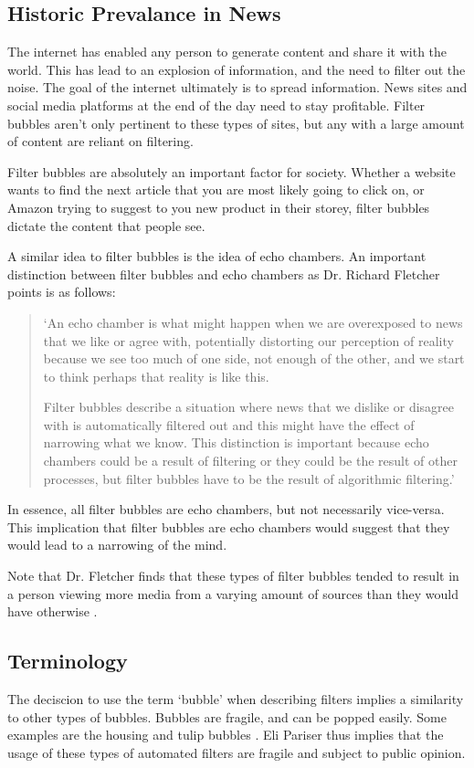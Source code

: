 \documentclass[12pt]{article}
\begin{document}
\subsection{Historic Prevalance in News}
The internet has enabled any person to generate content and share it with the
world. This has lead to an explosion of information, and the need to filter out
the noise. The goal of the internet ultimately is to spread information. News
sites and social media platforms at the end of the day need to stay profitable.
Filter bubbles aren't only pertinent to these types of sites, but any with
a large amount of content are reliant on filtering.

Filter bubbles are absolutely an important factor for society. Whether a website
wants to find the next article that you are most likely going to click on, or
Amazon trying to suggest to you new product in their storey, filter bubbles
dictate the content that people see.

A similar idea to filter bubbles is the idea of echo chambers. An important
distinction between filter bubbles and echo chambers as Dr. Richard Fletcher
points is as follows:

\begin{quote}
    `An echo chamber is what might happen when we are overexposed to news that we like or agree with, potentially distorting our perception of reality because we see too much of one side, not enough of the other, and we start to think perhaps that reality is like this.

    Filter bubbles describe a situation where news that we dislike or disagree with
    is automatically filtered out and this might have the effect of narrowing what
    we know. This distinction is important because echo chambers could be a result
    of filtering or they could be the result of other processes, but filter bubbles
    have to be the result of algorithmic filtering.' \cite{richard}
\end{quote}

In essence, all filter bubbles are echo chambers, but not necessarily vice-versa.
This implication that filter bubbles are echo chambers would suggest that they would
lead to a narrowing of the mind.

Note that Dr. Fletcher finds that these types of filter bubbles tended to result
in a person viewing more media from a varying amount of sources than they would
have otherwise \cite{richard}.

\subsection{Terminology}
The deciscion to use the term `bubble' when describing filters implies a
similarity to other types of bubbles. Bubbles are fragile, and can be popped
easily. Some examples are the housing \cite{publications2006us} and tulip
bubbles \cite{dash2011tulipomania}. Eli Pariser thus implies that the usage
of these types of automated filters are fragile and subject to public opinion.
\end{document}
